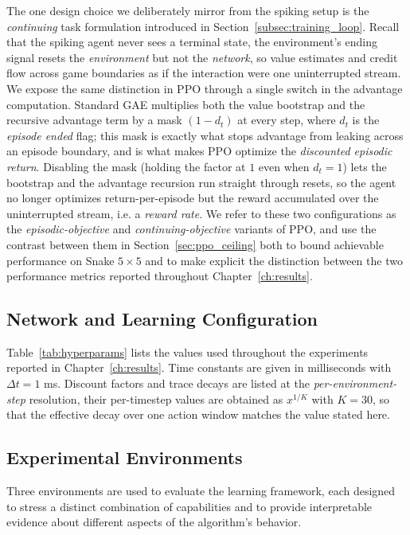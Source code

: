The one design choice we deliberately mirror from the spiking setup is the
\emph{continuing} task formulation introduced in
Section~\ref{subsec:training_loop}. Recall that the spiking agent never sees
a terminal state, the environment's ending signal resets the
\emph{environment} but not the \emph{network}, so value estimates and credit
flow across game boundaries as if the interaction were one uninterrupted
stream. We expose the same distinction in PPO through a single switch in the
advantage computation. Standard GAE multiplies both the value bootstrap and
the recursive advantage term by a mask $(1 - d_t)$ at every step, where $d_t$
is the \emph{episode ended} flag; this mask is exactly what stops advantage from
leaking across an episode boundary, and is what makes PPO optimize the
\emph{discounted episodic return}. Disabling the mask (holding the factor at
$1$ even when $d_t = 1$) lets the bootstrap and the advantage recursion run
straight through resets, so the agent no longer optimizes return-per-episode
but the reward accumulated over the uninterrupted stream, i.e. a
\emph{reward rate}. We refer to these two configurations as the
\emph{episodic-objective} and \emph{continuing-objective} variants of PPO,
and use the contrast between them in Section~\ref{sec:ppo_ceiling} both to
bound achievable performance on Snake $5\times5$ and to make explicit the
distinction between the two performance metrics reported throughout
Chapter~\ref{ch:results}.
\clearpage

 \subsection{Network and Learning Configuration}
\label{subsec:hyperparameters}

Table~\ref{tab:hyperparams} lists the values used throughout
the experiments reported in Chapter~\ref{ch:results}. Time
constants are given in milliseconds with $\Delta t = 1$ ms.
Discount factors and trace decays are listed at the
\emph{per-environment-step} resolution, their per-timestep
values are obtained as $x^{1/K}$ with $K=30$, so that the
effective decay over one action window matches the value
stated here.

\subsection{Experimental Environments}

Three environments are used to evaluate the learning framework, each designed to stress
a distinct combination of capabilities and to provide interpretable evidence about different
aspects of the algorithm's behavior.


